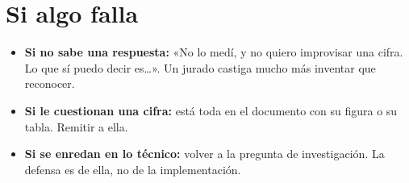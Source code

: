 \documentclass[11pt]{article}
\begin{document}
\section{Si algo falla}

\begin{itemize}\itemsep3pt
  \item \textbf{Si no sabe una respuesta:} «No lo medí, y no quiero improvisar una cifra.
    Lo que sí puedo decir es\dots». Un jurado castiga mucho más inventar que reconocer.
  \item \textbf{Si le cuestionan una cifra:} está toda en el documento con su figura o su
    tabla. Remitir a ella.
  \item \textbf{Si se enredan en lo técnico:} volver a la pregunta de investigación. La
    defensa es de ella, no de la implementación.
\end{itemize}
\end{document}
